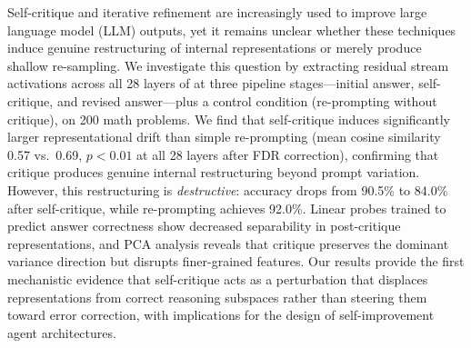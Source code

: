 Self-critique and iterative refinement are increasingly used to improve large language model (LLM) outputs, yet it remains unclear whether these techniques induce genuine restructuring of internal representations or merely produce shallow re-sampling. We investigate this question by extracting residual stream activations across all 28 layers of \qwen at three pipeline stages---initial answer, self-critique, and revised answer---plus a control condition (re-prompting without critique), on 200 \gsmk math problems. We find that self-critique induces significantly larger representational drift than simple re-prompting (mean cosine similarity 0.57 vs.\ 0.69, $p < 0.01$ at all 28 layers after FDR correction), confirming that critique produces genuine internal restructuring beyond prompt variation. However, this restructuring is \emph{destructive}: accuracy drops from 90.5\% to 84.0\% after self-critique, while re-prompting achieves 92.0\%. Linear probes trained to predict answer correctness show decreased separability in post-critique representations, and PCA analysis reveals that critique preserves the dominant variance direction but disrupts finer-grained features. Our results provide the first mechanistic evidence that self-critique acts as a perturbation that displaces representations from correct reasoning subspaces rather than steering them toward error correction, with implications for the design of self-improvement agent architectures.
